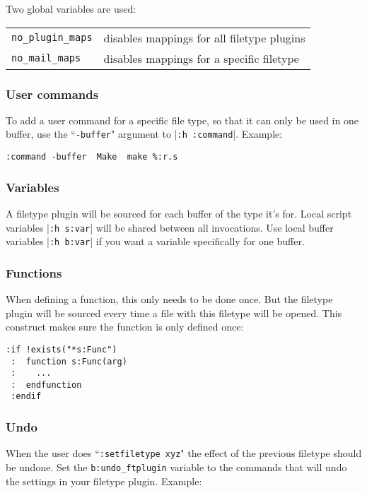 Two global variables are used:
\begin{center} \begin{tabular}{l l}
				\texttt{no\_plugin\_maps} & disables mappings for all filetype plugins \\
				\texttt{no\_mail\_maps} & disables mappings for a specific filetype \\
\end{tabular} \end{center}

\subsubsection{User commands}
To add a user command for a specific file type, so that it can only be used in one buffer, use the ``\texttt{-buffer}" argument to |\texttt{:h :command}|.
Example:

\begin{Verbatim}[samepage=true]
 :command -buffer  Make  make %:r.s
\end{Verbatim}

\subsubsection{Variables}
A filetype plugin will be sourced for each buffer of the type it's for.
Local script variables |\texttt{:h s:var}| will be shared between all invocations.
Use local buffer variables |\texttt{:h b:var}| if you want a variable specifically for one buffer.

\subsubsection{Functions}
When defining a function, this only needs to be done once.
But the filetype plugin will be sourced every time a file with this filetype will be opened.
This construct makes sure the function is only defined once:

\begin{Verbatim}[samepage=true]
 :if !exists("*s:Func")
 :  function s:Func(arg)
 :    ...
 :  endfunction
 :endif
\end{Verbatim}

\subsubsection{Undo}
\label{undo_ftplugin}

When the user does ``\texttt{:setfiletype xyz}" the effect of the previous filetype should be undone.
Set the \texttt{b:undo\_ftplugin} variable to the commands that will undo the settings in your filetype plugin.
Example:

